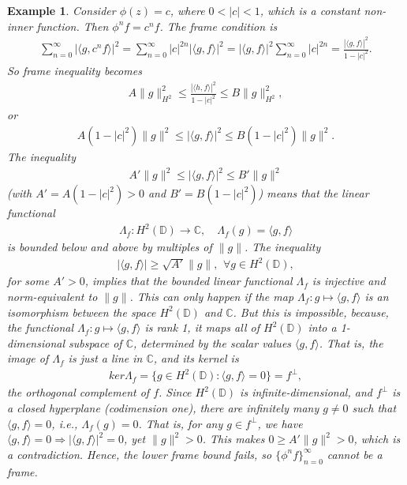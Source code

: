 \documentclass[12pt,titlepage]{amsart}
\newtheorem{exam}[thm]{Example}
\theoremstyle{definition}
\theoremstyle{remark}
\begin{document}
\begin{exam}
Consider $\phi(z) = c$, where $0 < |c| < 1$, which is a constant
non-inner function. Then $\phi^n f = c^n f$. The frame condition
is
\begin{eqnarray*}
\sum_{n=0}^\infty |\langle g, c^n f \rangle|^2 = \sum_{n=0}^\infty
|c|^{2n} |\langle g, f \rangle|^2 = |\langle g, f \rangle|^2
\sum_{n=0}^\infty |c|^{2n}= \frac{|\langle g, f \rangle|^2}{1 -
|c|^2}.
\end{eqnarray*}
So frame inequality becomes
\begin{eqnarray*}
A \|g\|_{H^2}^2 \leq \frac{|\langle h, f \rangle|^2}{1 - |c|^2}
\leq B \|g\|_{H^2}^2,
\end{eqnarray*}
or
\begin{eqnarray*}
A (1 - |c|^2) \|g\|^2 \leq |\langle g, f \rangle|^2 \leq B (1 -
|c|^2) \|g\|^2.
\end{eqnarray*}
The inequality
\begin{eqnarray*}
A' \|g\|^2 \leq |\langle g, f \rangle|^2 \leq B' \|g\|^2
\end{eqnarray*}
(with $A' = A(1-|c|^2) > 0$ and $B' = B(1-|c|^2)$) means that the
linear functional
\begin{eqnarray*}
\Lambda_f: H^2(\mathbb{D}) \to \mathbb{C}, \quad \Lambda_f(g) =
\langle g, f \rangle
\end{eqnarray*}
is bounded below and above by multiples of $\|g\|$. The inequality
\begin{eqnarray*}\label{ineq.3}
|\langle g, f \rangle| \geq \sqrt{A'} \|g\|, \,\ \forall g \in
H^2(\mathbb{D}),
\end{eqnarray*}
for some $A'>0$, implies that the bounded linear functional
$\Lambda_f$ is injective and norm-equivalent to $\|g\|$. This can
only happen if the map $\Lambda_f:g \mapsto \langle g, f \rangle$
is an isomorphism between the space $H^2(\mathbb{D})$ and
$\mathbb{C}$. But this is impossible, because, the functional
$\Lambda_f:g \mapsto \langle g, f \rangle$ is rank 1, it maps all
of $H^2(\mathbb{D})$ into a 1-dimensional subspace of
$\mathbb{C}$, determined by the scalar values $\langle g, f
\rangle$. That is, the image of $\Lambda_f$ is just a line in
$\mathbb{C}$, and its kernel is
\begin{eqnarray*}
ker \Lambda_f = \{ g \in H^2(\mathbb{D}) : \langle g, f \rangle =
0 \} = f^\perp,
\end{eqnarray*}
the orthogonal complement of $f$. Since $H^2(\mathbb{D})$ is
infinite-dimensional, and $f^\perp$ is a closed hyperplane
(codimension one), there are infinitely many $g \neq 0$ such that
$\langle g, f \rangle = 0$, i.e., $\Lambda_f(g) = 0$. That is, for
any $g \in f^\perp$, we have $\langle g, f \rangle = 0 \Rightarrow
|\langle g, f \rangle|^2 = 0$, yet $\|g\|^2 > 0$. This makes $0
\geq A' \|g\|^2 > 0$, which is a contradiction. Hence, the lower
frame bound fails, so $\{\phi^n f\}_{n=0}^\infty$ cannot be a
frame.


\end{exam}
\end{document}
